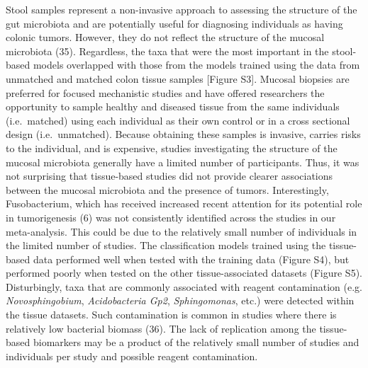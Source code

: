 \documentclass[12pt,]{article}
\begin{document}
Stool samples represent a non-invasive approach to assessing the
structure of the gut microbiota and are potentially useful for
diagnosing individuals as having colonic tumors. However, they do not
reflect the structure of the mucosal microbiota (35). Regardless, the
taxa that were the most important in the stool-based models overlapped
with those from the models trained using the data from unmatched and
matched colon tissue samples {[}Figure S3{]}. Mucosal biopsies are
preferred for focused mechanistic studies and have offered researchers
the opportunity to sample healthy and diseased tissue from the same
individuals (i.e.~matched) using each individual as their own control or
in a cross sectional design (i.e.~unmatched). Because obtaining these
samples is invasive, carries risks to the individual, and is expensive,
studies investigating the structure of the mucosal microbiota generally
have a limited number of participants. Thus, it was not surprising that
tissue-based studies did not provide clearer associations between the
mucosal microbiota and the presence of tumors. Interestingly,
Fusobacterium, which has received increased recent attention for its
potential role in tumorigenesis (6) was not consistently identified
across the studies in our meta-analysis. This could be due to the
relatively small number of individuals in the limited number of studies.
The classification models trained using the tissue-based data performed
well when tested with the training data (Figure S4), but performed
poorly when tested on the other tissue-associated datasets (Figure S5).
Disturbingly, taxa that are commonly associated with reagent
contamination (e.g. \emph{Novosphingobium}, \emph{Acidobacteria Gp2},
\emph{Sphingomonas}, etc.) were detected within the tissue datasets.
Such contamination is common in studies where there is relatively low
bacterial biomass (36). The lack of replication among the tissue-based
biomarkers may be a product of the relatively small number of studies
and individuals per study and possible reagent contamination.
\end{document}
